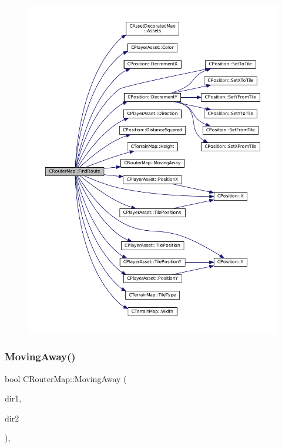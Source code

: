 \begin{figure}[H]
\begin{center}
\leavevmode
\includegraphics[width=350pt]{classCRouterMap_ac638dca74d6ebe3602db9f7c69881146_cgraph}
\end{center}
\end{figure}
\hypertarget{classCRouterMap_adf9041b4e1face1308c556c0ba0de9af}{}\label{classCRouterMap_adf9041b4e1face1308c556c0ba0de9af} 
\subsubsection{\texorpdfstring{Moving\+Away()}{MovingAway()}}
{\footnotesize\ttfamily bool C\+Router\+Map\+::\+Moving\+Away (\begin{DoxyParamCaption}\item[{\hyperlink{GameDataTypes_8h_acb2b033915f6659a71a38b5aa6e4eb42}{E\+Direction}}]{dir1,  }\item[{\hyperlink{GameDataTypes_8h_acb2b033915f6659a71a38b5aa6e4eb42}{E\+Direction}}]{dir2 }\end{DoxyParamCaption})\hspace{0.3cm}{\ttfamily [static]}, {\ttfamily [protected]}}



